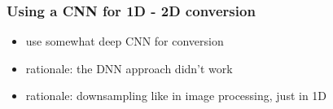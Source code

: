 \subsubsection{Using a CNN for 1D - 2D conversion}
\begin{itemize}
 \item use somewhat deep CNN for conversion
 \item rationale: the DNN approach didn't work
 \item rationale: downsampling like in image processing, just in 1D
\end{itemize}















